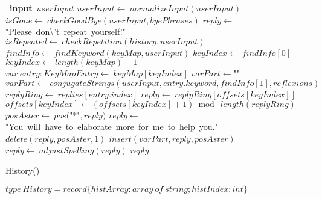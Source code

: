 \documentclass[a4paper,10pt]{article}
\begin{document}
\begin{algorithm}
\begin{algorithmic}[5]
  \REPEAT
    \STATE\ \textbf{input}\ \(userInput\)
    \STATE {}
    \STATE {}
    \STATE \(userInput\gets\ normalizeInput(userInput)\)
    \STATE \(isGone\gets\ checkGoodBye(userInput,byePhrases)\)
      \STATE \(reply\gets\)"{}Please\ don\textbackslash{}'{}t\ repeat\ yourself!"{}\(\)
      \STATE \(isRepeated\gets\ checkRepetition(history,userInput)\)
        \STATE \(findInfo\gets\ findKeyword(keyMap,userInput)\)
        \STATE \(keyIndex\gets\ findInfo[0]\)
          \STATE \(keyIndex\gets\ length(keyMap)-1\)
        \ENDIF
        \STATE \(var\ entry:KeyMapEntry\gets\ keyMap[keyIndex]\)
        \STATE \(varPart\gets\)"{}"{}\(\)
          \STATE \(varPart\gets\ conjugateStrings(userInput,entry.keyword,findInfo[1],reflexions)\)
        \ENDIF
        \STATE \(replyRing\gets\ replies[entry.index]\)
        \STATE \(reply\gets\ replyRing[offsets[keyIndex]]\)
        \STATE \(offsets[keyIndex]\gets(offsets[keyIndex]+1)\bmod\ length(replyRing)\)
        \STATE \(posAster\gets\ pos(\)"{}*"{}\(,reply)\)
            \STATE \(reply\gets\)"{}You\ will\ have\ to\ elaborate\ more\ for\ me\ to\ help\ you."{}\(\)
          \ELSE
            \STATE \(delete(reply,posAster,1)\)
            \STATE \(insert(varPart,reply,posAster)\)
          \ENDIF
        \ENDIF
        \STATE \(reply\gets\ adjustSpelling(reply)\)
      \ENDIF
      \PRINT\(reply\)
    \ENDIF

\end{algorithmic}
\end{algorithm}


\begin{algorithm}
\caption{History()}
\begin{algorithmic}[5]

\STATE {}
  \STATE {}
  \STATE {}
  \STATE {}
  \STATE {}
  \STATE {}
  \STATE {}
  \STATE \(type\ History=record\{histArray:array\ of\ string;histIndex:int\}\)

\end{algorithmic}
\end{algorithm}
\end{document}
